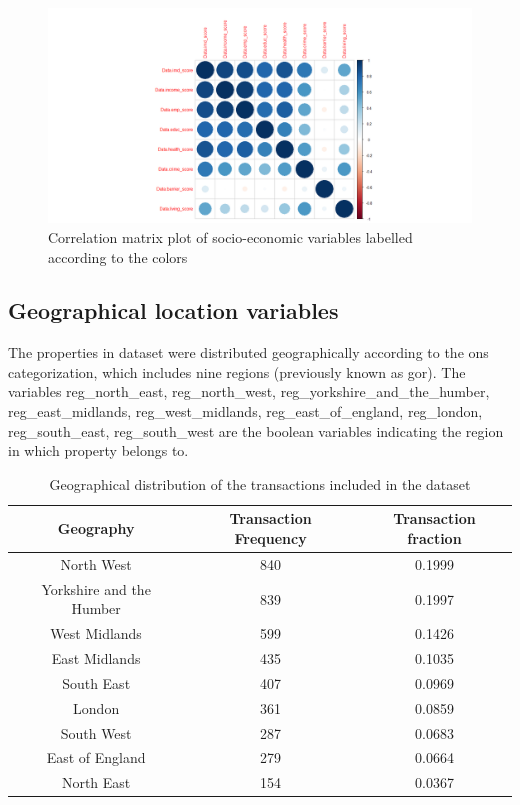 \documentclass[12pt]{article}
\begin{document}
\begin{figure}[H]
    \centering
    \includegraphics[width=18cm]{corrmat.png}
    \caption{Correlation matrix plot of socio-economic variables labelled according to the colors}
    \label{fig:corrmat}
\end{figure}

\subsection{Geographical location variables}
 The properties in dataset were distributed geographically according to the \acrfull{ons} categorization, which includes nine regions (previously known as \acrshort{gor}). The variables reg\_north\_east, reg\_north\_west, reg\_yorkshire\_and\_the\_humber, reg\_east\_midlands, reg\_west\_midlands, reg\_east\_of\_england, reg\_london, reg\_south\_east, reg\_south\_west are the boolean variables indicating the region in which property belongs to.

  \begin{table}[H]
\centering
\begin{tabular}{c c c} 
 \hline
 Geography & Transaction Frequency & Transaction fraction \\ [0.5ex] 
 \hline
 North West & 840 & 0.1999 \\
 Yorkshire and the Humber & 839 & 0.1997 \\
 West Midlands & 599 & 0.1426 \\
 East Midlands & 435 & 0.1035 \\
 South East & 407 & 0.0969 \\
 London & 361 & 0.0859 \\
 South West & 287 & 0.0683 \\
 East of England & 279 & 0.0664 \\
 North East & 154 & 0.0367 \\ [1ex] 
 \hline
\end{tabular}
\caption{Geographical distribution of the transactions included in the dataset}
\label{table:geo}
\end{table}
 
\end{document}
